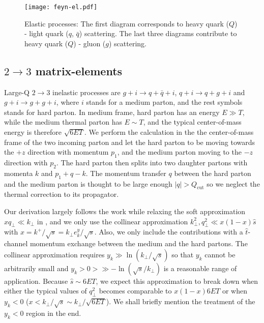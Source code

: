 \begin{figure}
\texttt{[image: feyn-el.pdf]}
\caption{Elastic processes: The first diagram corresponds to heavy quark ($Q$) - light quark ($q$, $\bar{q}$) scattering. The last three diagrams contribute to heavy quark ($Q$) - gluon ($g$) scattering.}\label{plots:feyn-elastic}
\end{figure}

\subsection{$2\rightarrow 3$ matrix-elements}
Large-Q $2\rightarrow 3$ inelastic processes are $g + i \rightarrow q+\bar{q} + i$, $q+i\rightarrow q+g+i$ and $g+i\rightarrow g+g+i$, where $i$ stands for a medium parton, and the rest symbols stands for hard parton.
In medium frame, hard parton has an energy $E\gg T$, while the medium thermal parton has $E\sim T$, and the typical center-of-mass energy is therefore $\sqrt{6ET}$.
We perform the calculation in the the center-of-mass frame of the two incoming parton and let the hard parton to be moving towards the $+z$ direction with momentum $p_1$, and the medium parton moving to the $-z$ direction with $p_2$.
The hard parton then splits into two daughter partons with momenta $k$ and $p_1 + q - k$.
The momentum transfer $q$ between the hard parton and the medium parton is thought to be large enough $|q| > Q_{\textrm{cut}}$ so we neglect the thermal correction to its propagator.

Our derivation largely follows the work \cite{Fochler:2013epa} while relaxing the soft approximation $xq_\perp \ll k_\perp$ in \cite{Fochler:2013epa}, and we only use the collinear approximation $k_\perp^2, q_\perp^2 \ll x(1-x) \hat{s}$ with $x = k^+/\sqrt{s} = k_\perp e^y_k /\sqrt{s}$.
Also, we only include the contributions with a $\hat{t}$-channel momentum exchange between the medium and the hard partons.
The collinear approximation requires $y_k \gg \ln(k_\perp/\sqrt{s})$ so that $y_k$ cannot be arbitrarily small and $y_k>0>\gg -\ln(\sqrt{s}/k_\perp)$ is a reasonable range of application.
Because $\hat{s}\sim 6 ET$, we expect this approximation to break down when either the typical values of $q_\perp^2$ becomes comparable to $x(1-x)6ET$ or when $y_k<0$ ($x < k_\perp/\sqrt{s} \sim k_\perp/\sqrt{6ET}$).
We shall briefly mention the treatment of the $y_k<0$ region in the end.

